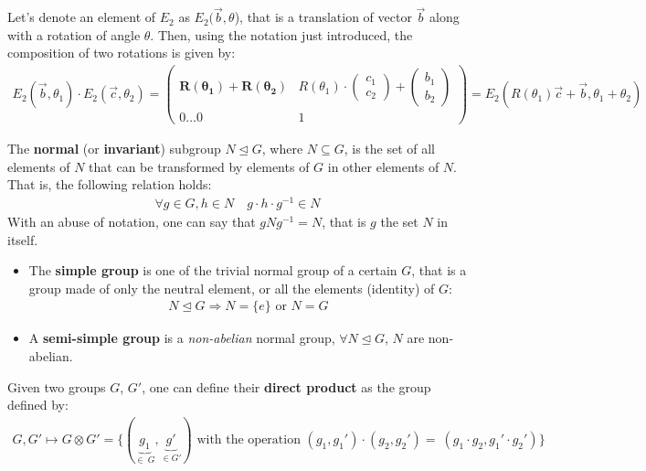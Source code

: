 \documentclass[../Theoretical.tex]{subfiles}
\begin{document}
Let's denote an element of $E_2$ as $E_2(\vec{b}, \theta$), that is a translation of vector $\vec{b}$ along with a rotation of angle $\theta$. Then, using the notation just introduced, the composition of two rotations is given by:
\begin{align*}
E_2(\vec{b}, \theta_1) \cdot E_2(\vec{c}, \theta_2) = \begin{pmatrix}
\bm{R(\theta_1)+R(\theta_2)} & R(\theta_1) \cdot \begin{pmatrix}c_1\\c_2\end{pmatrix} + \begin{pmatrix}b_1\\b_2\end{pmatrix}\\
0\dots 0 & 1
\end{pmatrix} = E_2(R(\theta_1)\vec{c}+\vec{b}, \theta_1+\theta_2)
\end{align*}

\begin{dfn}
The \textbf{normal} (or \textbf{invariant}) subgroup $N \trianglelefteq G$,  where $N \subseteq G$, is the set of all elements of $N$ that can be transformed by elements of $G$ in other elements of $N$. That is, the following  relation holds:
\begin{align*}
\forall g \in G, h \in N\quad g\cdot h\cdot g^{-1} \in N
\end{align*}
With an abuse of notation, one can say that $gNg^{-1} = N$, that is $g$  the set $N$ in itself.
\end{dfn}

\begin{itemize}
\item The \textbf{simple group} is one of the trivial normal group of a certain $G$, that is a group made of only the neutral element, or all the elements (identity) of $G$:
\begin{align*}
N \trianglelefteq G \Rightarrow N = \{e\} \text{ or } N=G
\end{align*}
\item A \textbf{semi-simple group} is a \textit{non-abelian} normal group, $\forall N \trianglelefteq G$, $N$ are non-abelian.
\end{itemize}

\begin{dfn}
Given two groups $G$, $G'$, one can define their \textbf{direct  product} as the group defined by:
\begin{align*}
G,G' \mapsto G\otimes G' = \{(\underbrace{g_1}_{\in\ G}, \underbrace{g'}_{\in G'}) \text{ with the operation } (g_1, g_1') \cdot (g_2, g_2') =\ (g_1\cdot g_2, g_1'\cdot g_2')\}
\end{align*}
\end{dfn}
\end{document}
